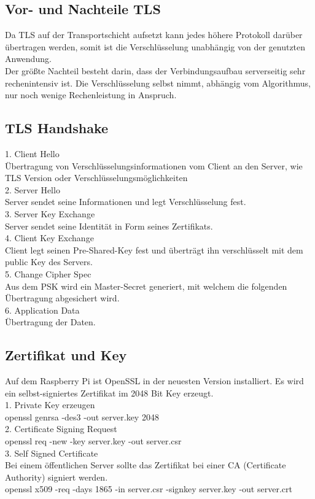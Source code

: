 \subsection{Vor- und Nachteile TLS}
Da TLS auf der Transportschicht aufsetzt kann jedes höhere Protokoll darüber übertragen werden, somit ist die Verschlüsselung unabhängig von der genutzten Anwendung. \\
	Der größte Nachteil besteht darin, dass der Verbindungsaufbau serverseitig sehr rechenintensiv ist. Die Verschlüsselung selbst nimmt, abhängig vom Algorithmus, nur noch wenige Rechenleistung in Anspruch. \\

\subsection{TLS Handshake}
1. Client Hello\\
Übertragung von Verschlüsselungsinformationen vom Client an den Server, wie TLS Version oder Verschlüsselungsmöglichkeiten\\
2. Server Hello \\
Server sendet seine Informationen und legt Verschlüsselung fest. \\
3. Server Key Exchange\\
Server sendet seine Identität in Form seines Zertifikats. \\
4. Client Key Exchange\\
Client legt seinen Pre-Shared-Key fest und überträgt ihn verschlüsselt mit dem public Key des Servers.\\
5. Change Cipher Spec\\
Aus dem PSK wird ein Master-Secret generiert, mit welchem die folgenden Übertragung abgesichert wird. \\
6. Application Data\\
Übertragung der Daten. \\

\subsection{Zertifikat und Key}
Auf dem Raspberry Pi ist OpenSSL in der neuesten Version installiert. Es wird ein selbst-signiertes Zertifikat im 2048 Bit Key erzeugt.\\
1. Private Key erzeugen\\
openssl genrsa -des3 -out server.key 2048\\
2. Certificate Signing Request\\
openssl req -new -key server.key -out server.csr\\
3. Self Signed Certificate\\
Bei einem öffentlichen Server sollte das Zertifikat bei einer CA (Certificate Authority) signiert werden. \\
openssl x509 -req -days 1865 -in server.csr -signkey server.key -out server.crt

